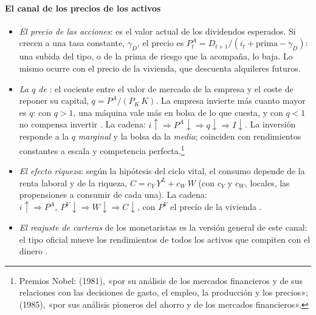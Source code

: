 \documentclass[11pt]{article}
\begin{document}
\paragraph{El canal de los precios de los activos}
\begin{itemize}
\item \emph{El precio de las acciones}: es el valor actual de los dividendos esperados. Si crecen a una tasa constante, $\gamma_D$, el precio es $P^A_t=D_{t+1}/(i_t+\text{prima}-\gamma_D)$: una subida del tipo, o de la prima de riesgo que la acompaña, lo baja. Lo mismo ocurre con el precio de la vivienda, que descuenta alquileres futuros.
\item \emph{La $q$ de }: el cociente entre el valor de mercado de la empresa y el coste de reponer su capital, $q=P^A/(P_K\,K)$. La empresa invierte más cuanto mayor es $q$: con $q>1$, una máquina vale más en bolsa de lo que cuesta, y con $q<1$ no compensa invertir\nocite{Tobin1969General} . La cadena: $i\uparrow\Rightarrow P^A\downarrow\Rightarrow q\downarrow\Rightarrow I\downarrow$. La inversión responde a la $q$ \emph{marginal} y la bolsa da la \emph{media}; coinciden con rendimientos constantes a escala y competencia perfecta\nocite{Hayashi1982Tobin}.\footnote{Premios Nobel:  (1981), «por su análisis de los mercados financieros y de sus relaciones con las decisiones de gasto, el empleo, la producción y los precios»\nocite{Nobel1981Tobin};  (1985), «por sus análisis pioneros del ahorro y de los mercados financieros»\nocite{Nobel1985Modigliani}.}
\item \emph{El efecto riqueza}: según la hipótesis del ciclo vital\nocite{AndoModigliani1963Life}, el consumo depende de la renta laboral y de la riqueza, $C=c_Y\,Y^L+c_W\,W$ (con $c_Y$ y $c_W$, locales, las propensiones a consumir de cada una). La cadena: $i\uparrow\Rightarrow P^A,\ P^{V}\downarrow\Rightarrow W\downarrow\Rightarrow C\downarrow$, con $P^V$ el precio de la vivienda .
\item \emph{El reajuste de carteras} de los monetaristas es la versión general de este canal: el tipo oficial mueve los rendimientos de todos los activos que compiten con el dinero .
\end{itemize}
\end{document}
